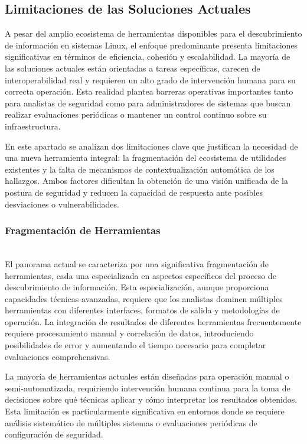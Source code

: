 \documentclass[runningheads]{llncs}
\begin{document}
\subsection{Limitaciones de las Soluciones Actuales}

A pesar del amplio ecosistema de herramientas disponibles para el descubrimiento de información en sistemas Linux, el enfoque predominante presenta limitaciones significativas en términos de eficiencia, cohesión y escalabilidad. La mayoría de las soluciones actuales están orientadas a tareas específicas, carecen de interoperabilidad real y requieren un alto grado de intervención humana para su correcta operación. Esta realidad plantea barreras operativas importantes tanto para analistas de seguridad como para administradores de sistemas que buscan realizar evaluaciones periódicas o mantener un control continuo sobre su infraestructura.

En este apartado se analizan dos limitaciones clave que justifican la necesidad de una nueva herramienta integral: la fragmentación del ecosistema de utilidades existentes y la falta de mecanismos de contextualización automática de los hallazgos. Ambos factores dificultan la obtención de una visión unificada de la postura de seguridad y reducen la capacidad de respuesta ante posibles desviaciones o vulnerabilidades.

\subsubsection{Fragmentación de Herramientas}
\hfill\\

El panorama actual se caracteriza por una significativa fragmentación de herramientas, cada una especializada en aspectos específicos del proceso de descubrimiento de información. Esta especialización, aunque proporciona capacidades técnicas avanzadas, requiere que los analistas dominen múltiples herramientas con diferentes interfaces, formatos de salida y metodologías de operación. La integración de resultados de diferentes herramientas frecuentemente requiere procesamiento manual y correlación de datos, introduciendo posibilidades de error y aumentando el tiempo necesario para completar evaluaciones comprehensivas.

La mayoría de herramientas actuales están diseñadas para operación manual o semi-automatizada, requiriendo intervención humana continua para la toma de decisiones sobre qué técnicas aplicar y cómo interpretar los resultados obtenidos. Esta limitación es particularmente significativa en entornos donde se requiere análisis sistemático de múltiples sistemas o evaluaciones periódicas de configuración de seguridad.
\end{document}
